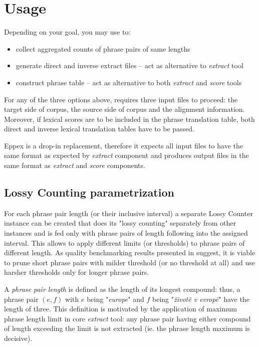 
\chapter{Usage}
\label{chap:usage}

Depending on your goal, you may use \eppex{} to:
\begin{itemize}
 \item collect aggregated counts of phrase pairs of same lengths
 \item generate direct and inverse extract files -- act as alternative to \emph{extract} tool
 \item construct phrase table -- act as alternative to both \emph{extract} and \emph{score} tools
\end{itemize}

For any of the three options above, \eppex{} requires three input files to proceed:
the target side of corpus, the source side of corpus and the alignment information.
Moreover, if lexical scores are to be included in the phrase translation table,
both direct and inverse lexical translation tables have to be passed.

Eppex is a drop-in replacement, therefore it expects all input files to have the same
format as expected by \emph{extract} component and produces output files in the same
format as \emph{extract} and \emph{score} components.

\section{Lossy Counting parametrization}

For each phrase pair length (or their inclusive interval) a separate Lossy Counter
instance can be created that does its "lossy counting" separately from other instances
and is fed only with phrase pairs of length following into the assigned interval.
This allows to apply different limits (or thresholds) to phrase pairs of different length.
As quality benchmarking results presented in  suggest, it is viable
to prune short phrase pairs with milder threshold (or no threshold at all) and use harsher
thresholds only for longer phrase pairs.

A \emph{phrase pair length} is defined as the length of its longest compound:
thus, a phrase pair $(e,f)$ with $e$ being "\emph{europe}" and $f$ being
"\emph{životě v evropě}" have the length of three.
This definition is motivated by the application of maximum phrase length limit
in core \emph{extract} tool: any phrase pair having either compound of length
exceeding the limit is not extracted (ie. the phrase length maximum is decisive).

